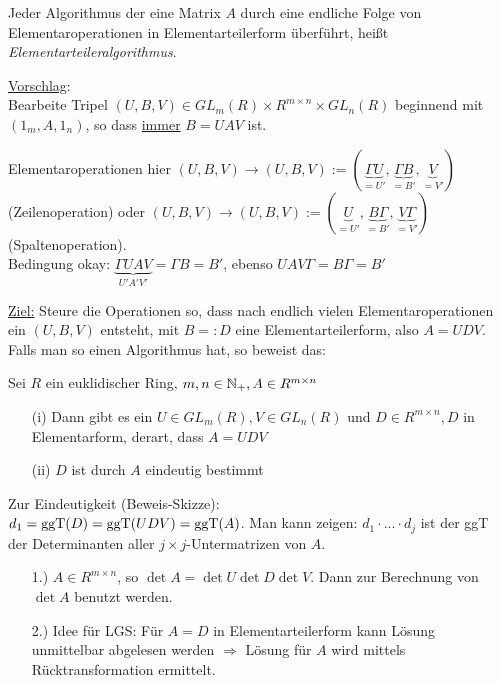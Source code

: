 \documentclass[a4paper,twoside,DIV15,BCOR12mm]{scrbook}
\begin{document}
Jeder Algorithmus der eine Matrix $A$ durch eine endliche Folge von
Elementaroperationen in Elementarteilerform überführt, heißt
\emph{Elementarteileralgorithmus}.

\underline{Vorschlag}:\\
Bearbeite Tripel $(U,B, V) \in GL_m(R) \times R^{m \times n} \times
GL_n(R)$ beginnend mit $(1_m, A, 1_n)$, so dass \underline{immer} $B
= UAV$ ist.

Elementaroperationen hier $(U,B,V) \to (U,B,V) := (\underbrace{\Gamma U}_{= U'},\underbrace{\Gamma B}_{= B'}, \underbrace{V}_{= V'})$ (Zeilenoperation) oder $(U,B,V) \to (U,B,V) := (\underbrace{U}_{= U'},\underbrace{B \Gamma}_{= B'}, \underbrace{V \Gamma}_{= V'})$ (Spaltenoperation).\\
Bedingung okay: $\underbrace{\Gamma UAV}_{U'A'V'} = \Gamma B = B'$,
ebenso $UAV\Gamma = B \Gamma = B'$

\underline{Ziel:} Steure die Operationen so, dass nach endlich vielen Elementaroperationen ein $(U,B,V)$ entsteht, mit $B =: D$ eine Elementarteilerform, also $A = UDV$.\\
Falls man so einen Algorithmus hat, so beweist das:
\begin{satz}[Elementarteilersatz]
    Sei $R$ ein euklidischer Ring, $m, n \in \mathbb{N}_+, A \in R^{m \times n}$
    \begin{itemize}
        \item[(i)] Dann gibt es ein $U \in GL_m(R), V \in GL_n(R)$ und $D \in R^{m \times n}, D$ in Elementarform, derart, dass \underline{$A = UDV$}
        \item[(ii)] $D$ ist durch $A$ eindeutig bestimmt
    \end{itemize}
\end{satz}

Zur Eindeutigkeit (Beweis-Skizze):\\
$d_1 = \mathop{\rm ggT}\nolimits(D) = \mathop{\rm ggT}\nolimits(UDV) = \mathop{\rm ggT}\nolimits(A)$. Man kann zeigen: $d_1 \cdot
... \cdot d_j$ ist der ggT der Determinanten aller $j \times
j$-Untermatrizen von $A$.

\begin{bemerkung}
    \begin{itemize}
        \item[1.)] $A \in R^{m \times n}$, so $\det A = \det U \det D \det V$. Dann zur Berechnung von $\det A$ benutzt werden.
        \item[2.)] Idee für LGS: Für $A = D$ in Elementarteilerform kann Lösung unmittelbar abgelesen werden $\Rightarrow$ Lösung für $A$ wird mittels Rücktransformation ermittelt.
    \end{itemize}
\end{bemerkung}
\end{document}

